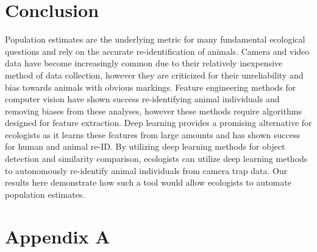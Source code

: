 \documentclass[11pt]{article}
\begin{document}
\section*{Conclusion}
Population estimates are the underlying metric for many fundamental ecological questions and rely on the accurate re-identification of animals. Camera and video data have become increasingly common due to their relatively inexpensive method of data collection, however they are criticized for their unreliability and bias towards animals with obvious markings. Feature engineering methods for computer vision have shown success re-identifying animal individuals and removing biases from these analyses, however these methods require algorithms designed for feature extraction. Deep learning provides a promising alternative for ecologists as it learns these features from large amounts and has shown success for human and animal re-ID. By utilizing deep learning methods for object detection and similarity comparison, ecologists can utilize deep learning methods to autonomously re-identify animal individuals from camera trap data. Our results here demonstrate how such a tool would allow ecologists to automate population estimates.
\newpage

\section*{Appendix A}
\end{document}
